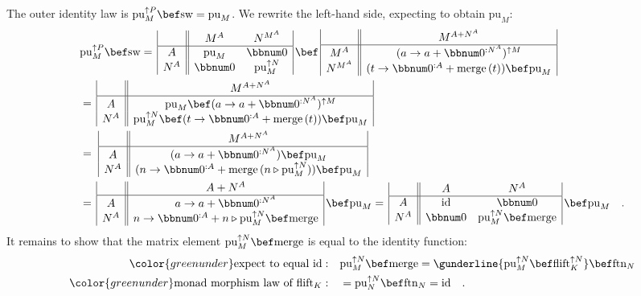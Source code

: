 The outer identity law is $\text{pu}_{M}^{\uparrow P}\bef\text{sw}=\text{pu}_{M}$.
We rewrite the left-hand side, expecting to obtain $\text{pu}_{M}$:
\begin{align*}
 & \text{pu}_{M}^{\uparrow P}\bef\text{sw}=\,\begin{array}{|c||cc|}
 & M^{A} & N^{M^{A}}\\
\hline A & \text{pu}_{M} & \bbnum 0\\
N^{A} & \bbnum 0 & \text{pu}_{M}^{\uparrow N}
\end{array}\,\bef\,\begin{array}{|c||c|}
 & M^{A+N^{A}}\\
\hline M^{A} & (a\rightarrow a+\bbnum 0^{:N^{A}})^{\uparrow M}\\
N^{M^{A}} & (t\rightarrow\bbnum 0^{:A}+\text{merge}\,(t))\bef\text{pu}_{M}
\end{array}\\
 & =\,\begin{array}{|c||c|}
 & M^{A+N^{A}}\\
\hline A & \text{pu}_{M}\bef(a\rightarrow a+\bbnum 0^{:N^{A}})^{\uparrow M}\\
N^{A} & \text{pu}_{M}^{\uparrow N}\bef(t\rightarrow\bbnum 0^{:A}+\text{merge}\,(t))\bef\text{pu}_{M}
\end{array}\\
 & =\,\,\begin{array}{|c||c|}
 & M^{A+N^{A}}\\
\hline A & (a\rightarrow a+\bbnum 0^{:N^{A}})\bef\text{pu}_{M}\\
N^{A} & (n\rightarrow\bbnum 0^{:A}+\text{merge}\,(n\triangleright\text{pu}_{M}^{\uparrow N}))\bef\text{pu}_{M}
\end{array}\\
 & =\,\begin{array}{|c||c|}
 & A+N^{A}\\
\hline A & a\rightarrow a+\bbnum 0^{:N^{A}}\\
N^{A} & n\rightarrow\bbnum 0^{:A}+n\triangleright\text{pu}_{M}^{\uparrow N}\bef\text{merge}
\end{array}\,\bef\text{pu}_{M}=\,\begin{array}{|c||cc|}
 & A & N^{A}\\
\hline A & \text{id} & \bbnum 0\\
N^{A} & \bbnum 0 & \text{pu}_{M}^{\uparrow N}\bef\text{merge}
\end{array}\,\bef\text{pu}_{M}\quad.
\end{align*}
It remains to show that the matrix element $\text{pu}_{M}^{\uparrow N}\bef\text{merge}$
is equal to the identity function:
\begin{align*}
{\color{greenunder}\text{expect to equal }\text{id}:}\quad & \text{pu}_{M}^{\uparrow N}\bef\text{merge}=\gunderline{\text{pu}_{M}^{\uparrow N}\bef\text{flift}_{K}^{\uparrow N}}\bef\text{ftn}_{N}\\
{\color{greenunder}\text{monad morphism law of }\text{flift}_{K}:}\quad & =\text{pu}_{N}^{\uparrow N}\bef\text{ftn}_{N}=\text{id}\quad.
\end{align*}

